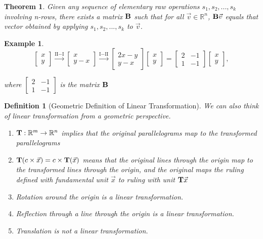 \documentclass[12pt, a4paper]{article}
\newtheorem{thm}{Theorem}[subsection]
\newtheorem{df}{Definition}[subsection]
\newtheorem{eg}{Example}[subsection]
\def\R{{\mathbb{R}}}
\def\T{{\vb{T}}}
\def\matrixB{\vb{B}}
\begin{document}
\begin{thm}
Given any sequence of elementary raw operations $s_1, s_2,...,s_k$ involving n-rows, there exists a matrix $\matrixB$ such that for all $\vec{v}\in\R^n$, $\matrixB\vec{v}$ equals that vector obtained by applying $s_1, s_2,...,s_k$ to $\vec{v}$.
\end{thm}

\begin{eg}
$$\begin{bmatrix}x\\y\end{bmatrix}\xrightarrow[]{\text{II}-\text{I}}\begin{bmatrix}x\\y-x\end{bmatrix}\xrightarrow[]{\text{I}-\text{II}}\begin{bmatrix}2x-y\\y-x\end{bmatrix}\begin{bmatrix}x\\y\end{bmatrix}=\begin{bmatrix}2&-1\\1&-1\end{bmatrix}\begin{bmatrix}x\\y
\end{bmatrix},$$

where $\begin{bmatrix}2&-1\\1&-1\end{bmatrix}$ is the matrix $\matrixB$
\end{eg}

\begin{df}[Geometric Definition of Linear Transformation]
We can also think of linear transformation from a geometric perspective. 

\begin{enumerate}
\item $\T: \R^m\rightarrow\R^n$ implies that the original parallelograms map to the transformed parallelograms
\item $\T(c\times \vec{x})=c\times\T(\vec{x})$ means that the original lines through the origin map to the transformed lines through the origin, and the original maps the ruling defined with fundamental unit $\vec{x}$ to ruling with unit $\T\vec{x}$
\item Rotation around the origin is a linear transformation. 
\item Reflection through a line through the origin is a linear transformation.
\item Translation is not a linear transformation.
\end{enumerate}
\end{df}
\end{document}
